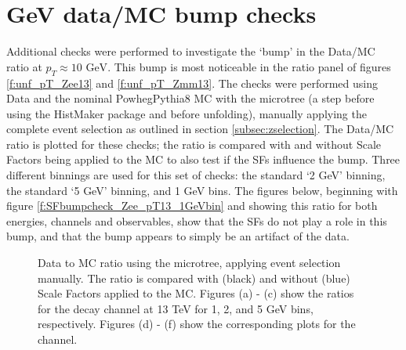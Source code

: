 \section{ GeV data/MC bump checks }
\label{sec:zpt_bump}

Additional checks were performed to investigate the `bump' in the \pTZ Data/MC ratio at $p_{T} \approx 10 \textrm{ GeV}$. This bump is most noticeable in the ratio panel of figures \ref{f:unf_pT_Zee13} and \ref{f:unf_pT_Zmm13}. The checks were performed using Data and the nominal PowhegPythia8 MC with the \pTZ microtree (a step before using the HistMaker package and before unfolding), manually applying the complete \Zboson event selection as outlined in section \ref{subsec:zselection}. The Data/MC ratio is plotted for these checks; the ratio is compared with and without Scale Factors being applied to the MC to also test if the SFs influence the bump. Three different binnings are used for this set of checks: the standard `2 GeV' \pTZ binning, the standard `5 GeV' \ut binning, and 1 GeV bins. The figures below, beginning with figure \ref{f:SFbumpcheck_Zee_pT13_1GeVbin} and showing this ratio for both energies, channels and observables, show that the SFs do not play a role in this bump, and that the bump appears to simply be an artifact of the data.

\begin{figure}[h]
\centering
{}

\caption{Data to MC ratio using the \pTZ microtree, applying \Zboson event selection manually. The ratio is compared with (black) and without (blue) Scale Factors applied to the MC. Figures (a) - (c) show the \ptdilep ratios for the \Zee decay channel at 13 TeV for 1, 2, and 5 GeV bins, respectively. Figures (d) - (f) show the corresponding plots for the \Zmm channel.}\end{figure}

